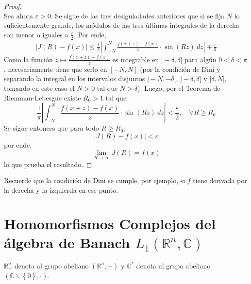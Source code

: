 \documentclass[12pt]{report}
\theoremstyle{largebreak}
\renewcommand{\leq}{\ensuremath{\leqslant}}
\renewcommand{\geq}{\ensuremath{\geqslant}}
\newcommand\abs[1]{\ensuremath{\left|#1\right|}}
\begin{document}
\begin{proof}
\begin{equation*}
        \end{equation*}
        Sea ahora $\varepsilon>0$. Se sigue de las tres desiguladades anteriores que si se fija $N$ lo suficientemente grande, los módulos de las tres últimas integrales de la derecha son menor o iguales a $\frac{\varepsilon}{2}$. Por ende,
        \begin{equation*}
            \begin{split}
                \abs{J(R)-f(x)}\leq\frac{1}{\pi}\abs{\int_{-N}^{N}\frac{f(x+z)-f(x)}{z}\cdot\sin(Rz)\:dz}+\frac{\varepsilon}{2}
            \end{split}
        \end{equation*}
        Como la función $z\mapsto\frac{f(x+z)-f(x)}{z}$ es integrable en $]-\delta,\delta[$ para algún $0<\delta<\pi$, necesariamente tiene que serlo en $[-N,N]$ (por la condición de Dini y separando la integral en los intervalos disjuntos $]-N,-\delta[$, $]-\delta,\delta[$ y $]\delta, N[$, tomando en este caso el $N>0$ tal que $N>\delta$). Luego, por el Teorema de Riemman-Lebesgue existe $R_0>1$ tal que
        \begin{equation*}
            \frac{1}{\pi}\abs{\int_{-N}^{N}\frac{f(x+z)-f(x)}{z}\cdot\sin(Rz) \:dz}<\frac{\varepsilon}{2},\quad\forall R\geq R_0
        \end{equation*} 
        Se sigue entonces que para todo $R\geq R_0$:
        \begin{equation*}
            \abs{J(R)-f(x)}<\varepsilon
        \end{equation*}
        por ende,
        \begin{equation*}
            \lim_{ R\rightarrow\infty}J(R)=f(x)
        \end{equation*}
        lo que prueba el resultado.
    \end{proof}

    \begin{obs}
        Recuerde que la condición de Dini se cumple, por ejemplo, si $f$ tiene derivada por la derecha y la izquierda en ese punto.
    \end{obs}

    \section{Homomorfismos Complejos del álgebra de Banach $L_1(\mathbb{R}^n,\mathbb{C} )$}

    \begin{obs}
        $\mathbb{R}^n_+$ denota al grupo abeliano $(\mathbb{R}^n,+)$ y $\mathbb{C}^*$ denota al grupo abeliano $(\mathbb{C}\backslash\left\{0\right\},\cdot)$.
    \end{obs}
\end{document}
